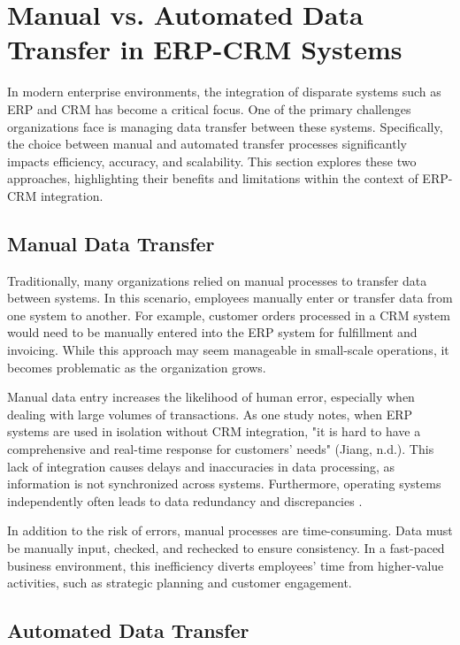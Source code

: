 \section{Manual vs. Automated Data Transfer in ERP-CRM Systems}

In modern enterprise environments, the integration of disparate systems such as ERP and CRM has become a critical focus. One of the primary challenges organizations face is managing data transfer between these systems. Specifically, the choice between manual and automated transfer processes significantly impacts efficiency, accuracy, and scalability. This section explores these two approaches, highlighting their benefits and limitations within the context of ERP-CRM integration.

\subsection{Manual Data Transfer}

Traditionally, many organizations relied on manual processes to transfer data between systems. In this scenario, employees manually enter or transfer data from one system to another. For example, customer orders processed in a CRM system would need to be manually entered into the ERP system for fulfillment and invoicing. While this approach may seem manageable in small-scale operations, it becomes problematic as the organization grows.

Manual data entry increases the likelihood of human error, especially when dealing with large volumes of transactions. As one study notes, when ERP systems are used in isolation without CRM integration, "it is hard to have a comprehensive and real-time response for customers' needs" (Jiang, n.d.). This lack of integration causes delays and inaccuracies in data processing, as information is not synchronized across systems. Furthermore, operating systems independently often leads to data redundancy and discrepancies \cite{tomic2016}.

In addition to the risk of errors, manual processes are time-consuming. Data must be manually input, checked, and rechecked to ensure consistency. In a fast-paced business environment, this inefficiency diverts employees' time from higher-value activities, such as strategic planning and customer engagement.

\subsection{Automated Data Transfer}

